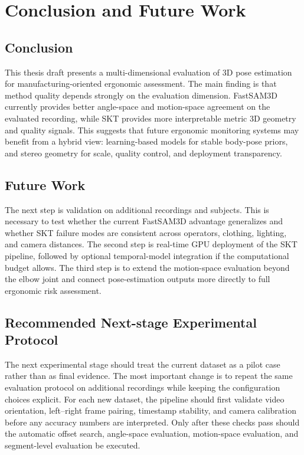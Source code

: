 \documentclass[12pt,a4paper]{article}
\begin{document}
\clearpage
\section{Conclusion and Future Work}
\label{sec:conclusion}

\subsection{Conclusion}

This thesis draft presents a multi-dimensional evaluation of 3D pose estimation
for manufacturing-oriented ergonomic assessment.
The main finding is that method quality depends strongly on the evaluation
dimension.
FastSAM3D currently provides better angle-space and motion-space agreement on
the evaluated recording, while SKT provides more interpretable metric 3D
geometry and quality signals.
This suggests that future ergonomic monitoring systems may benefit from a
hybrid view: learning-based models for stable body-pose priors, and stereo
geometry for scale, quality control, and deployment transparency.

\subsection{Future Work}

The next step is validation on additional recordings and subjects.
This is necessary to test whether the current FastSAM3D advantage generalizes
and whether SKT failure modes are consistent across operators, clothing,
lighting, and camera distances.
The second step is real-time GPU deployment of the SKT pipeline, followed by
optional temporal-model integration if the computational budget allows.
The third step is to extend the motion-space evaluation beyond the elbow joint
and connect pose-estimation outputs more directly to full ergonomic risk
assessment.

\subsection{Recommended Next-stage Experimental Protocol}

The next experimental stage should treat the current dataset as a pilot case
rather than as final evidence.
The most important change is to repeat the same evaluation protocol on
additional recordings while keeping the configuration choices explicit.
For each new dataset, the pipeline should first validate video orientation,
left--right frame pairing, timestamp stability, and camera calibration before
any accuracy numbers are interpreted.
Only after these checks pass should the automatic offset search, angle-space
evaluation, motion-space evaluation, and segment-level evaluation be executed.
\end{document}
